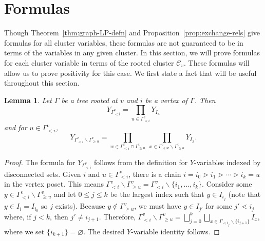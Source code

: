\documentclass[10pt,a4paper]{amsart}
\numberwithin{equation}{section}
\newtheorem{Lemma}[Theorem]{Lemma}
\newcommand{\calC}{\mathcal{C}}
\begin{document}
\section{Formulas}\label{sec:formulas}
Though Theorem~\ref{thm:graph-LP-defn} and Proposition~\ref{prop:exchange-rels} give formulas for all cluster variables, these formulas are not guaranteed to be in terms of the variables in any given cluster. In this section, we will prove formulas for each cluster variable in terms of the rooted cluster $\calC_v$. These formulas will allow us to prove positivity for this case.
We first state a fact that will be useful throughout this section.
\begin{Lemma}
\label{lem:in-cluster}
Let $\Gamma$ be a tree rooted at $v$ and $i$ be a vertex of $\Gamma$. Then \[Y_{\Gamma_{< i}^v}=\prod_{u\in\Gamma_{\lessdot i}^v}Y_{I_u}\]
and for $u\in\Gamma_{< i}^v$,
\[ Y_{\Gamma_{< i}^v \backslash \Gamma_{\geq u}^v} = \prod_{w \in \Gamma_{\leq i}^v \cap \Gamma_{\geq u}^{v}} ~\prod_{x \in \Gamma_{\lessdot w}^{v} \backslash \Gamma_{\geq u}^{v}} Y_{I_{x}}. \]
\end{Lemma}
\begin{proof}
The formula for $Y_{\Gamma_{< i}^v}$ follows from the definition for $Y$-variables indexed by disconnected sets.
Given $i$ and $u \in \Gamma_{< i}^{v}$, there is a chain $i = i_0 \gtrdot i_1 \gtrdot \cdots \gtrdot i_k = u$ in the vertex poset. This means $\Gamma_{< i}^v \backslash \Gamma_{\geq u}^v = \Gamma_{< i}^v \backslash \{ i_1, \dots, i_k \}.$ Consider some $y \in \Gamma_{< i}^v \backslash \Gamma_{\geq u}^v$ and let $0 \leq j \leq k$ be the largest index such that $y \in I_{i_j}$ (note that $y\in I_i=I_{i_0}$ so $j$ exists). Because $y \not\in \Gamma_{\geq u}^v$, we must have $y \in I_{j'}$ for some $j' \lessdot i_j$ where, if $j < k$, then $j' \neq i_{j+1}$.
Therefore, $\Gamma_{< i}^v \backslash \Gamma_{\geq u}^v = \bigsqcup_{j = 0}^k \bigsqcup_{x \in \Gamma_{\lessdot i_j} \backslash \{ i_{j+1} \}} I_{x}$, where we set $\{i_{k+1}\} = \varnothing$. The desired $Y$-variable identity follows.
\end{proof}
\end{document}
